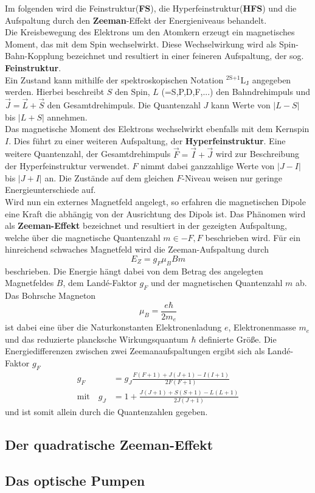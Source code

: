 Im folgenden wird die Feinstruktur(\textbf{FS}), die Hyperfeinstruktur(\textbf{HFS}) und die Aufspaltung durch den \textbf{Zeeman}-Effekt der Energieniveaus behandelt.
\\
Die Kreisbewegung des Elektrons um den Atomkern erzeugt ein magnetisches Moment, das mit dem Spin wechselwirkt.
Diese Wechselwirkung wird als Spin-Bahn-Kopplung bezeichnet und resultiert in einer feineren Aufspaltung, der sog. \textbf{Feinstruktur}.
\\
Ein Zustand kann mithilfe der spektroskopischen Notation $^\text{2S+1}\text{L}_\text{J}$ angegeben werden.
Hierbei beschreibt $S$ den Spin, $L$ (=S,P,D,F,...) den Bahndrehimpuls und $\vec{J} = \vec{L} + \vec{S}$ den Gesamtdrehimpuls.
Die Quantenzahl $J$ kann Werte von $|L-S|$ bis $|L+S|$ annehmen.
\\
Das magnetische Moment des Elektrons wechselwirkt ebenfalls mit dem Kernspin $I$.
Dies führt zu einer weiteren Aufspaltung, der \textbf{Hyperfeinstruktur}.
Eine weitere Quantenzahl, der Gesamtdrehimpuls $\vec{F} = \vec{I} + \vec{J}$ wird zur Beschreibung der Hyperfeinstruktur verwendet.
$F$ nimmt dabei ganzzahlige Werte von $|J-I|$ bis $|J+I|$ an.
Die Zustände auf dem gleichen $F$-Niveau weisen nur geringe Energieunterschiede auf.
\\
Wird nun ein externes Magnetfeld angelegt, so erfahren die magnetischen Dipole eine Kraft die abhängig von der Ausrichtung des Dipols ist.
Das Phänomen wird als \textbf{Zeeman-Effekt} bezeichnet und resultiert in der gezeigten Aufspaltung, welche über die magnetische Quantenzahl $m \in {-F, F}$ beschrieben wird.
Für ein hinreichend schwaches Magnetfeld wird die Zeeman-Aufspaltung durch
\begin{equation}
    E_Z = g_F \mu_B B m
\end{equation}
beschrieben.
Die Energie hängt dabei von dem Betrag des angelegten Magnetfeldes $B$, dem Landé-Faktor $g_F$ und der magnetischen Quantenzahl $m$ ab.
Das Bohrsche Magneton
\begin{equation}
    \mu_B = \frac{e \hbar}{2 m_e}
\end{equation}
ist dabei eine über die Naturkonstanten Elektronenladung $e$, Elektronenmasse $m_e$ und das reduzierte plancksche Wirkungsquantum $\hbar$ definierte Größe.
Die Energiedifferenzen zwischen zwei Zeemanaufspaltungen ergibt sich als Landé-Faktor $g_F$
\begin{align}
    g_F &= g_J \frac{F(F+1) + J(J+1) - I(I+1)}{2F(F+1)} \label{eqn:g_F} \\
    \text{mit} \quad g_J &= 1 + \frac{J(J+1) + S(S+1) - L(L+1)}{2J(J+1)} \label{eqn:g_J}
\end{align}
und ist somit allein durch die Quantenzahlen gegeben.


\FloatBarrier
\subsection{Der quadratische Zeeman-Effekt}
\subsection{Das optische Pumpen}